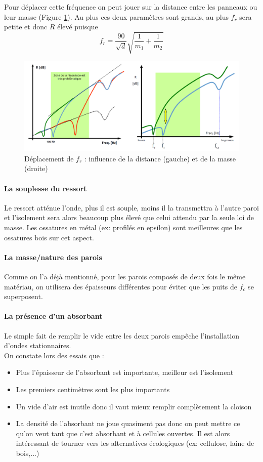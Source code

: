 \documentclass[11pt]{report}
\begin{document}
Pour déplacer cette fréquence on peut jouer sur la distance entre les panneaux ou leur masse (Figure \ref{dis}). Au plus ces deux paramètres sont grands, au plus $f_r$ sera petite et donc $R$ élevé puisque 
$$f_r =\frac{90}{\sqrt{d}}\sqrt{\frac{1}{m_1}+\frac{1}{m_2}}$$

\begin{figure}[ht]
\centering
\includegraphics[width=0.8\linewidth]{dis}
\caption{Déplacement de $f_r$ : influence de la distance (gauche) et de la masse (droite)}
\label{dis}
\end{figure}


\paragraph{La souplesse du ressort} Le ressort atténue l'onde, plus il est souple, moins il la transmettra à l'autre paroi et l'isolement sera alors beaucoup plus élevé que celui attendu par la seule loi de masse. Les ossatures en métal (ex: profilés en epsilon) sont meilleures que les ossatures bois sur cet aspect.

\paragraph{La masse/nature des parois}
Comme on l'a déjà mentionné, pour les parois composés de deux fois le même matériau, on utilisera des épaisseurs différentes pour éviter que les puits de $f_c$ se superposent.

\paragraph{La présence d'un absorbant} Le simple fait de remplir le vide entre les deux parois empêche l'installation d'ondes stationnaires.\\

On constate lors des essais que :
\begin{itemize}
\item Plus l'épaisseur de l'absorbant est importante, meilleur est l'isolement
\item Les premiers centimètres sont les plus importants
\item Un vide d'air est inutile donc il vaut mieux remplir complètement la cloison
\item La densité de l'absorbant ne joue quasiment pas donc on peut mettre ce qu'on veut tant que c'est absorbant et à cellules ouvertes. Il est alors intéressant de tourner vers les alternatives écologiques (ex: cellulose, laine de bois,...)
\end{itemize}
\end{document}

